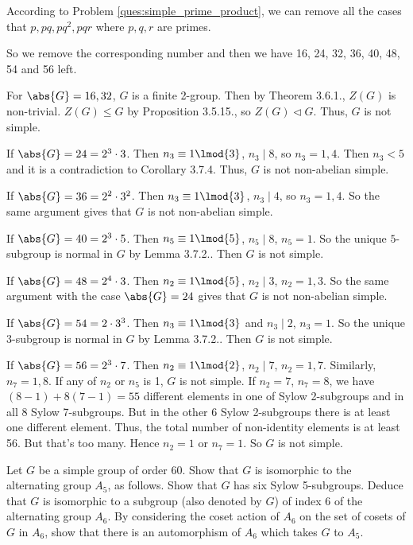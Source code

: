 \begin{solution}[\bf Solution.]
According to Problem \ref{ques:simple_prime_product}, we can remove all the cases that $p,pq,pq^2,pqr$ where $p,q,r$ are primes.

So we remove the corresponding number and then we have 16, 24, 32, 36, 40, 48, 54 and 56 left.

For $\abs{G} = 16,32$, $G$ is a finite 2-group. Then by Theorem 3.6.1., $Z(G)$ is non-trivial. $Z(G) \leq G$ by Proposition 3.5.15., so $Z(G) \lhd G$. Thus, $G$ is not simple.

If $\abs{G} = 24 = 2^3 \cdot 3$. Then $n_3 \equiv 1 \lmod{3}$, $n_3\mid 8$, so $n_3 = 1,4$. Then $n_3 < 5$ and it is a contradiction to Corollary 3.7.4. Thus, $G$ is not non-abelian simple.

If $\abs{G} = 36 = 2^2 \cdot 3^2$. Then $n_3 \equiv 1 \lmod{3}$, $n_3\mid 4$, so $n_3=1,4$. So the same argument gives that $G$ is not non-abelian simple.

If $\abs{G} = 40 = 2^3 \cdot 5$. Then $n_5\equiv 1\lmod{5}$, $n_5 \mid 8$, $n_5 = 1$. So the unique $5$-subgroup is normal in $G$ by Lemma 3.7.2.. Then $G$ is not simple.

If $\abs{G} = 48 = 2^4 \cdot 3$. Then $n_2 \equiv 1 \lmod{5}$, $n_2 \mid 3$, $n_2 = 1,3$. So the same argument with the case $\abs{G} = 24$ gives that $G$ is not non-abelian simple.

If $\abs{G} = 54 = 2\cdot 3^3$. Then $n_3 \equiv 1\lmod{3}$ and $n_3 \mid 2$, $n_3 = 1$. So the unique $3$-subgroup is normal in $G$ by Lemma 3.7.2.. Then $G$ is not simple.

If $\abs{G} = 56 = 2^3 \cdot 7$. Then $n_2\equiv 1\lmod{2}$, $n_2 \mid 7$, $n_2 = 1,7$. Similarly, $n_7 = 1,8$. If any of $n_2$ or $n_5$ is 1, $G$ is not simple. If $n_2 = 7$, $n_7 = 8$, we have $(8-1) + 8(7-1) = 55$ different elements in one of Sylow 2-subgroups and in all 8 Sylow 7-subgroups. But in the other 6 Sylow 2-subgroups there is at least one different element. Thus, the total number of non-identity elements is at least 56. But that's too many. Hence $n_2 = 1$ or $n_7 = 1$. So $G$ is not simple.
\end{solution}


\begin{problem}
Let $G$ be a simple group of order 60. Show that $G$ is isomorphic to the alternating group $A_5$, as follows. Show that $G$ has six Sylow 5-subgroups. Deduce that $G$ is isomorphic to a subgroup (also denoted by $G$) of index 6 of the alternating group $A_6$. By considering the coset action of $A_6$ on the set of cosets of $G$ in $A_6$, show that there is an automorphism of $A_6$ which takes $G$ to $A_5$. %
\end{problem}

